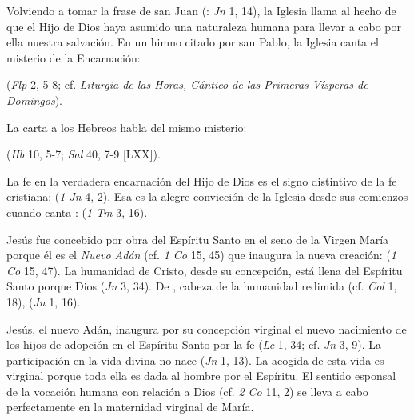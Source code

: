 	 Volviendo a tomar la frase de san Juan (: \emph{Jn} 1, 14), la Iglesia llama  al hecho de que el Hijo de Dios haya asumido una naturaleza humana para llevar a cabo por ella nuestra salvación. En un himno citado por san Pablo, la Iglesia canta el misterio de la Encarnación:
	
	 (\emph{Flp} 2, 5-8; cf. \emph{Liturgia de las Horas, Cántico de las Primeras Vísperas de Domingos}).
	
	 La carta a los Hebreos habla del mismo misterio:
	
	 (\emph{Hb} 10, 5-7; \emph{Sal} 40, 7-9 {[}LXX{]}).
	
	 La fe en la verdadera encarnación del Hijo de Dios es el signo distintivo de la fe cristiana:  (\emph{1 Jn} 4, 2). Esa es la alegre convicción de la Iglesia desde sus comienzos cuando canta :  (\emph{1 Tm} 3, 16).
	
	 Jesús fue concebido por obra del Espíritu Santo en el seno de la Virgen María porque él es el \emph{Nuevo Adán} (cf. \emph{1 Co} 15, 45) que inaugura la nueva creación:  (\emph{1 Co} 15, 47). La humanidad de Cristo, desde su concepción, está llena del Espíritu Santo porque Dios  (\emph{Jn} 3, 34). De , cabeza de la humanidad redimida (cf. \emph{Col} 1, 18),  (\emph{Jn} 1, 16).
	
	 Jesús, el nuevo Adán, inaugura por su concepción virginal el nuevo nacimiento de los hijos de adopción en el Espíritu Santo por la fe  (\emph{Lc} 1, 34; cf. \emph{Jn} 3, 9). La participación en la vida divina no nace  (\emph{Jn} 1, 13). La acogida de esta vida es virginal porque toda ella es dada al hombre por el Espíritu. El sentido esponsal de la vocación humana con relación a Dios (cf. \emph{2 Co} 11, 2) se lleva a cabo perfectamente en la maternidad virginal de María.
	
